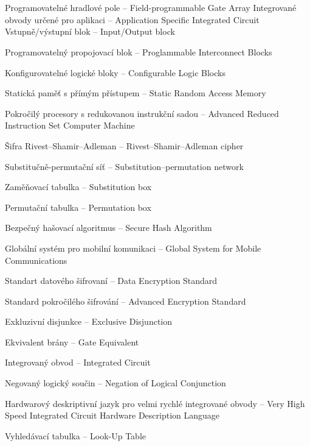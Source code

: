 \cleardoublepage
\chapter*{\listofabbrevname}
{}

\begin{acronym}[21]
		{Programovatelné hradlové pole -- Field-programmable Gate Array}
		{Integrované obvody určené pro aplikaci -- Application Specific Integrated Circuit}
		{Vstupně/výstupní blok -- Input/Output block}
		
		{Programovatelný propojovací blok -- Proglammable Interconnect Blocks}
		
		{Konfigurovatelné logické bloky -- Configurable Logic Blocks}
		
		{Statická paměť s přímým přístupem -- Static Random Access Memory}
		
		{Pokročilý procesory s redukovanou instrukční sadou -- Advanced Reduced Instruction Set Computer Machine}
		
		{Šifra Rivest\nobreakdash--Shamir\nobreakdash--Adleman -- Rivest\nobreakdash--Shamir\nobreakdash--Adleman cipher}
		
		{Substitučně-permutační síť -- Substitution–permutation network}
		
		{Zaměňovací tabulka -- Substitution box}
		
		{Permutační tabulka -- Permutation box}
		
		{Bezpečný hašovací algoritmus -- Secure Hash Algorithm}
		
		{Globální systém pro mobilní komunikaci -- Global System for Mobile Communications}
		
		{Standart datového šifrovaní -- Data Encryption Standard}
		
		{Standard pokročilého šifrování -- Advanced Encryption Standard}
		
		{Exkluzivní disjunkce -- Exclusive Disjunction}
		
		{Ekvivalent brány -- Gate Equivalent}
		
		{Integrovaný obvod -- Integrated Circuit}
		
		{Negovaný logický součin -- Negation of Logical Conjunction}
		
		{Hardwarový deskriptivní jazyk pro velmi rychlé integrované obvody -- Very High Speed Integrated Circuit Hardware Description Language}
	
		{Vyhledávací tabulka -- Look-Up Table}
											

\end{acronym}
